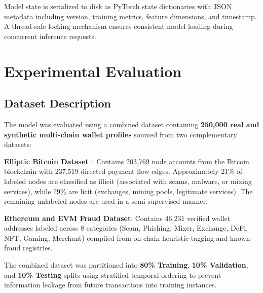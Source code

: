 \documentclass[conference]{IEEEtran}
\begin{document}
Model state is serialized to disk as PyTorch state dictionaries with JSON metadata including version, training metrics, feature dimensions, and timestamp. A thread-safe locking mechanism ensures consistent model loading during concurrent inference requests.

\section{Experimental Evaluation}
\label{sec:experiments}

\subsection{Dataset Description}
The model was evaluated using a combined dataset containing \textbf{250,000 real and synthetic multi-chain wallet profiles} sourced from two complementary datasets:

\textbf{Elliptic Bitcoin Dataset}~\cite{elliptic2019}: Contains 203,769 node accounts from the Bitcoin blockchain with 237,519 directed payment flow edges. Approximately 21\% of labeled nodes are classified as illicit (associated with scams, malware, or mixing services), while 79\% are licit (exchanges, mining pools, legitimate services). The remaining unlabeled nodes are used in a semi-supervised manner.

\textbf{Ethereum and EVM Fraud Dataset}: Contains 46,231 verified wallet addresses labeled across 8 categories (Scam, Phishing, Mixer, Exchange, DeFi, NFT, Gaming, Merchant) compiled from on-chain heuristic tagging and known fraud registries.

The combined dataset was partitioned into \textbf{80\% Training}, \textbf{10\% Validation}, and \textbf{10\% Testing} splits using stratified temporal ordering to prevent information leakage from future transactions into training instances.
\end{document}
